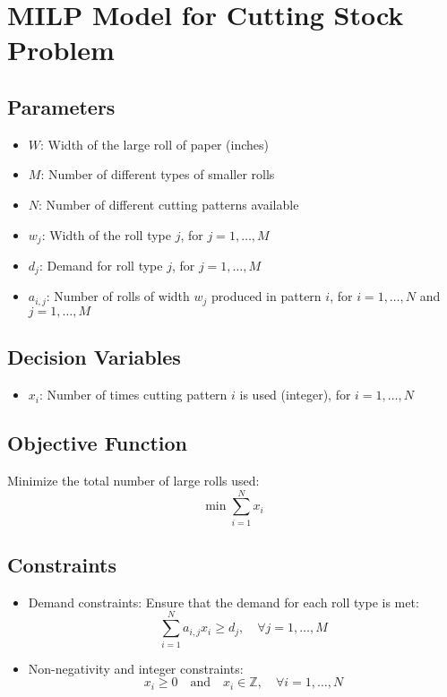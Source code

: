 \documentclass{article}
\begin{document}
\section*{MILP Model for Cutting Stock Problem}

\subsection*{Parameters}

\begin{itemize}
    \item $W$: Width of the large roll of paper (inches)
    \item $M$: Number of different types of smaller rolls
    \item $N$: Number of different cutting patterns available
    \item $w_j$: Width of the roll type $j$, for $j = 1, \ldots, M$
    \item $d_j$: Demand for roll type $j$, for $j = 1, \ldots, M$
    \item $a_{i,j}$: Number of rolls of width $w_j$ produced in pattern $i$, for $i = 1, \ldots, N$ and $j = 1, \ldots, M$
\end{itemize}

\subsection*{Decision Variables}

\begin{itemize}
    \item $x_i$: Number of times cutting pattern $i$ is used (integer), for $i = 1, \ldots, N$
\end{itemize}

\subsection*{Objective Function}

Minimize the total number of large rolls used:
\[
\min \sum_{i=1}^{N} x_i
\]

\subsection*{Constraints}

\begin{itemize}
    \item Demand constraints: Ensure that the demand for each roll type is met:
    \[
    \sum_{i=1}^{N} a_{i,j} x_i \geq d_j, \quad \forall j = 1, \ldots, M
    \]
    \item Non-negativity and integer constraints: 
    \[
    x_i \geq 0 \quad \text{and} \quad x_i \in \mathbb{Z}, \quad \forall i = 1, \ldots, N
    \]
\end{itemize}
\end{document}
